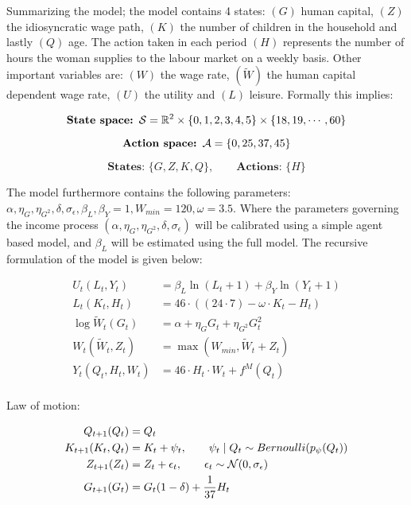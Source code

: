 Summarizing the model; the model contains 4 states: $(G)$ human capital, $(Z)$ the idiosyncratic wage path, $(K)$ the number of children in the household and lastly $(Q)$ age. The action taken in each period $(H)$ represents the number of hours the woman supplies to the labour market on a weekly basis. Other important variables are: $(W)$ the wage rate, $(\tilde{W})$ the human capital dependent wage rate,  $(U)$ the utility and $(L)$ leisure. Formally this implies:

\begin{equation}
    \textbf{State space: }\mathcal{S} = \mathbb{R}^{2} \times \{0, 1, 2, 3, 4, 5\} \times \{ 18, 19, \cdots, 60\}
\end{equation}

\begin{equation}
    \textbf{Action space: }\mathcal{A}  = \{0, 25, 37, 45\} 
\end{equation}

\begin{equation}
    \textbf{States: }\{G, Z, K, Q\}, \qquad \textbf{Actions: } \{H\} 
\end{equation}

The model furthermore contains the following parameters: $\alpha, \eta_G, \eta_{G^2}, \delta, \sigma_\epsilon, \beta_L, \beta_Y=1, W_{min}=120, \omega=3.5$. Where the parameters governing the income process $(\alpha, \eta_G, \eta_{G^2}, \delta, \sigma_\epsilon)$ will be calibrated using a simple agent based model, and $\beta_L$ will be estimated using the full model. The recursive formulation of the model is given below:

\begin{align}
    U_t(L_t, Y_t) &= \beta_L \ln(L_t + 1) + \beta_Y \ln(Y_t + 1) \label{eq:utility_v1}\\
    L_t(K_t, H_t) &= 46 \cdot ((24 \cdot 7) - \omega \cdot K_t  - H_t) \label{eq:leissure_v1}\\
    \log \tilde{W}_t (G_t) &= \alpha + \eta_G G_t + \eta_{G^2} G_t^2 \label{eq:salary_tilde_v1}\\
    W_t(\tilde{W}_t, Z_t) &= \max(W_{min} , \tilde{W}_t  + Z_t)  \label{eq:salary_v1}\\
    Y_t(Q_t,H_t, W_t) &= 46 \cdot H_t \cdot W_t + f^M(Q_t) \label{eq:total_salary_v1}\\
\end{align}

Law of motion:

\begin{align}
    Q_{t+1}(Q_t) &= Q_t \label{eq:age_v1}\\
    K_{t+1}(K_t, Q_t)  &= K_{t} + \psi_t, \qquad \psi_t \mid Q_t \sim Bernoulli(p_\psi(Q_t)) \label{eq:fertility_v1} \\
    Z_{t+1}(Z_t) &= Z_t + \epsilon_t, \qquad \epsilon_t \sim \mathcal{N}(0, \sigma_\epsilon) \label{eq:idiosyncratic_wage_path_v1}\\
    G_{t+1}(G_t) &= G_t(1 - \delta) + \frac{1}{37} H_t \\
\end{align}


